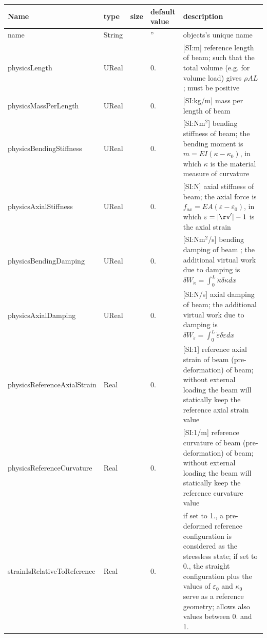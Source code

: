 \begin{center}
  \footnotesize
  \begin{longtable}{| p{4.5cm} | p{2.5cm} | p{0.5cm} | p{2.5cm} | p{6cm} |}
    \hline
    \bf Name & \bf type & \bf size & \bf default value & \bf description \\ \hline
    name &     String &      &     '' &     objects's unique name\\ \hline
    physicsLength &     UReal &      &     0. &      [SI:m] reference length of beam; such that the total volume (e.g. for volume load) gives $\rho A L$; must be positive\\ \hline
    physicsMassPerLength &     UReal &      &     0. &      [SI:kg/m] mass per length of beam\\ \hline
    physicsBendingStiffness &     UReal &      &     0. &      [SI:Nm$^2$] bending stiffness of beam; the bending moment is $m = EI (\kappa - \kappa_0)$, in which $\kappa$ is the material measure of curvature\\ \hline
    physicsAxialStiffness &     UReal &      &     0. &      [SI:N] axial stiffness of beam; the axial force is $f_{ax} = EA (\varepsilon -\varepsilon_0)$, in which $\varepsilon = |\rv^\prime|-1$ is the axial strain\\ \hline
    physicsBendingDamping &     UReal &      &     0. &      [SI:Nm$^2$/s] bending damping of beam ; the additional virtual work due to damping is $\delta W_{\dot \kappa} = \int_0^L \dot \kappa \delta \kappa dx$\\ \hline
    physicsAxialDamping &     UReal &      &     0. &      [SI:N/s] axial damping of beam; the additional virtual work due to damping is $\delta W_{\dot\varepsilon} = \int_0^L \dot \varepsilon \delta \varepsilon dx$\\ \hline
    physicsReferenceAxialStrain &     Real &      &     0. &      [SI:1] reference axial strain of beam (pre-deformation) of beam; without external loading the beam will statically keep the reference axial strain value\\ \hline
    physicsReferenceCurvature &     Real &      &     0. &      [SI:1/m] reference curvature of beam (pre-deformation) of beam; without external loading the beam will statically keep the reference curvature value\\ \hline
    strainIsRelativeToReference &     Real &      &     0. &      if set to 1., a pre-deformed reference configuration is considered as the stressless state; if set to 0., the straight configuration plus the values of $\varepsilon_0$ and $\kappa_0$ serve as a reference geometry; allows also values between 0. and 1.\\ \hline

\end{longtable}
\end{center}
